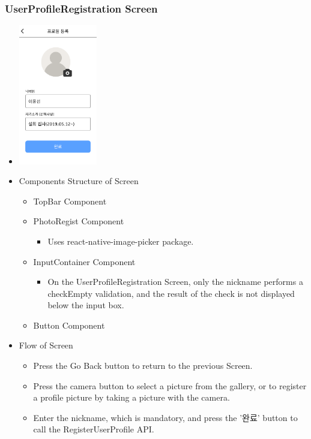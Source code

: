 \documentclass[conference]{IEEEtran}
\begin{document}
\subsubsection{UserProfileRegistration Screen}
\begin{itemize}
    \item[] \includegraphics[width=0.27\textwidth]{img/D/4.png}
    \item Components Structure of Screen
    \begin{itemize}
        \item TopBar Component
        \item PhotoRegist Component
        \begin{itemize}
            \item Uses react-native-image-picker package.
        \end{itemize}
        \item InputContainer Component
        \begin{itemize}
            \item On the UserProfileRegistration Screen, only the nickname performs a checkEmpty validation, and the result of the check is not displayed below the input box.
        \end{itemize}
        \item Button Component
    \end{itemize}
    \item Flow of Screen
    \begin{itemize}
        \item Press the Go Back button to return to the previous Screen.
        \item Press the camera button to select a picture from the gallery, or to register a profile picture by taking a picture with the camera.
        \item Enter the nickname, which is mandatory, and press the '완료' button to call the RegisterUserProfile API.
        \\
    \end{itemize}
\end{itemize}
\newpage
\end{document}
